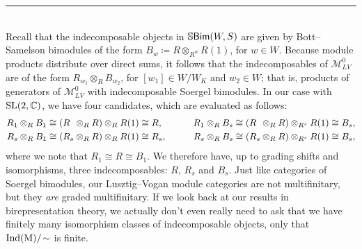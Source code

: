 \begin{example}
\begin{center}
\rule{0.5\linewidth}{1pt}
\end{center}
\noindent\\[-\baselineskip]
\noindent Recall that the indecomposable objects in $\mathbb{S}\textnormal{\textsf{Bim}}(W, S)$ are given by Bott--Samelson bimodules of the form $B_w \coloneqq R \otimes_{R^w} R(1)$, for $w \in W$. Because module products distribute over direct sums, it follows that the indecomposables of $\mathcal{M}_{LV}^0$ are of the form $R_{w_1} \otimes_R B_{w_2}$, for $[w_1] \in W/W_K$ and $w_2 \in W$; that is, products of generators of $\mathcal{M}_{LV}^0$ with indecomposable Soergel bimodules. In our case with $\textnormal{SL}(2, \mathbb{C})$, we have four candidates, which are evaluated as follows:
\begin{alignat*}{2}
R_1 \otimes_R B_1 \cong (R\hphantom{{}_{s}} \otimes_R R) \otimes_R R(1) &\cong R,&\qquad R_1 \otimes_R B_{s} \cong (R\hphantom{{}_{s}} \otimes_R R) \otimes_{R^{s}} R(1) &\cong B_{s},\\
R_{s} \otimes_R B_1 \cong (R_{s} \otimes_R R) \otimes_R R(1) &\cong R_{s},&\qquad R_{s} \otimes_R B_{s} \cong (R_{s} \otimes_R R) \otimes_{R^{s}} R(1) &\cong B_{s},
\end{alignat*}
\noindent where we note that $R_1 \cong R \cong B_1$. We therefore have, up to grading shifts and isomorphisms, three indecomposables: $R$, $R_{s}$ and $B_{s}$. Just like categories of Soergel bimodules, our Lusztig--Vogan module categories are not multifinitary, but they {\em are} graded multifinitary. If we look back at our results in birepresentation theory, we actually don't even really need to ask that we have finitely many isomorphism classes of indecomposable objects, only that $\textnormal{Ind}(\textnormal{M})/\!\sim$ is finite.\newpage


\end{example}
